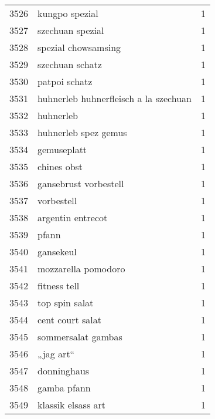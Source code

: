 \begin{tabular}{llr}
3526 &                                     kungpo spezial &      1 \\
3527 &                                   szechuan spezial &      1 \\
3528 &                                spezial chowsamsing &      1 \\
3529 &                                    szechuan schatz &      1 \\
3530 &                                      patpoi schatz &      1 \\
3531 &              huhnerleb huhnerfleisch a la szechuan &      1 \\
3532 &                                          huhnerleb &      1 \\
3533 &                               huhnerleb spez gemus &      1 \\
3534 &                                        gemuseplatt &      1 \\
3535 &                                        chines obst &      1 \\
3536 &                              gansebrust vorbestell &      1 \\
3537 &                                         vorbestell &      1 \\
3538 &                                  argentin entrecot &      1 \\
3539 &                                              pfann &      1 \\
3540 &                                          gansekeul &      1 \\
3541 &                                mozzarella pomodoro &      1 \\
3542 &                                       fitness tell &      1 \\
3543 &                                     top spin salat &      1 \\
3544 &                                   cent court salat &      1 \\
3545 &                                 sommersalat gambas &      1 \\
3546 &                                          „jag art“ &      1 \\
3547 &                                        donninghaus &      1 \\
3548 &                                        gamba pfann &      1 \\
3549 &                                 klassik elsass art &      1 \\

\end{tabular}
